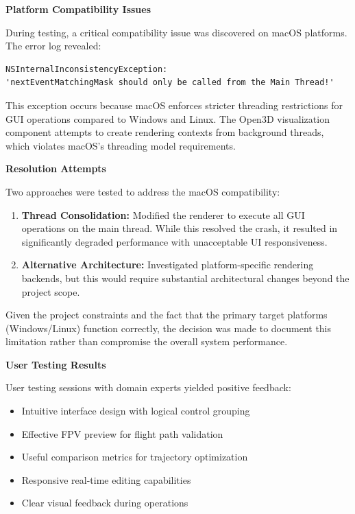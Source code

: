 \documentclass[11pt,a4paper]{article}
\begin{document}
\textbf{Platform Compatibility Issues}

During testing, a critical compatibility issue was discovered on macOS platforms. The error log revealed:

\begin{verbatim}
NSInternalInconsistencyException: 
'nextEventMatchingMask should only be called from the Main Thread!'
\end{verbatim}

This exception occurs because macOS enforces stricter threading restrictions for GUI operations compared to Windows and Linux. The Open3D visualization component attempts to create rendering contexts from background threads, which violates macOS's threading model requirements.

\textbf{Resolution Attempts}

Two approaches were tested to address the macOS compatibility:

\begin{enumerate}
\item \textbf{Thread Consolidation:} Modified the renderer to execute all GUI operations on the main thread. While this resolved the crash, it resulted in significantly degraded performance with unacceptable UI responsiveness.
\item \textbf{Alternative Architecture:} Investigated platform-specific rendering backends, but this would require substantial architectural changes beyond the project scope.
\end{enumerate}

Given the project constraints and the fact that the primary target platforms (Windows/Linux) function correctly, the decision was made to document this limitation rather than compromise the overall system performance.

\textbf{User Testing Results}

User testing sessions with domain experts yielded positive feedback:
\begin{itemize}
\item Intuitive interface design with logical control grouping
\item Effective FPV preview for flight path validation
\item Useful comparison metrics for trajectory optimization
\item Responsive real-time editing capabilities
\item Clear visual feedback during operations
\end{itemize}
\end{document}
